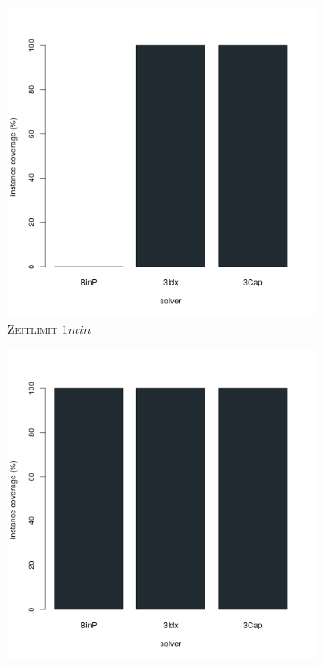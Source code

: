 \begin{figure}[H]
\centering

\begin{subfigure}[b]{0.3\textwidth}
\centering
\includegraphics[width=1.2\textwidth]{img/solver_instance_coverage_b=3_m_60s.png}
\caption{\textsc{Zeitlimit} $1min$}
\label{fig:instance_coverage_b=3_m_a}
\end{subfigure}
\hfill
\begin{subfigure}[b]{0.3\textwidth}
\centering
\includegraphics[width=1.2\textwidth]{img/solver_instance_coverage_b=3_m_120s.png}

\end{subfigure}
\end{figure}
